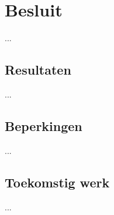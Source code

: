 \chapter{Besluit}
\label{besluit}
...

\section{Resultaten}
...

\section{Beperkingen}
...

\section{Toekomstig werk}
...


